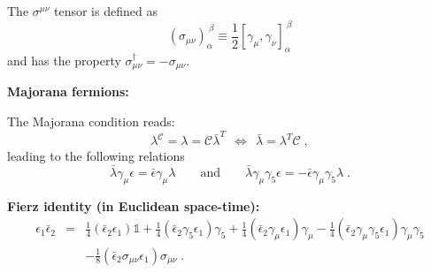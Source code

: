 \begin{appendix}
\noindent
The $\sigma^{\mu\nu}$ tensor is defined as
\begin{equation}
  (\sigma_{\mu\nu})^{~\beta}_\alpha\equiv\frac{1}{2}[\gamma_\mu,\gamma_\nu]^{~\beta}_\alpha
\end{equation}
and has the property $\sigma_{\mu\nu}^\dagger=-\sigma_{\mu\nu}$.

\noindent
\textbf{Majorana fermions:}

\noindent
The Majorana condition reads:
\begin{equation}
\label{mjconj1}
 \lambda^\mathcal{C}=\lambda=\mathcal{C}\bar{\lambda}^T~~
\Longleftrightarrow~~\bar{\lambda}=\lambda^T\mathcal{C}\;,
\end{equation}
leading to the following relations
\begin{equation}
\bar{\lambda}\gamma_{\mu}\epsilon = \bar{\epsilon}\gamma_{\mu}\lambda \qquad \text{and} \qquad \bar{\lambda}\gamma_{\mu}\gamma_{5}\epsilon = - \bar{\epsilon}\gamma_{\mu}\gamma_{5}\lambda\;.
\end{equation}

\noindent
\textbf{Fierz identity (in Euclidean space-time):}
\begin{eqnarray}
\epsilon_{1}\bar{\epsilon}_{2} &=&  \frac{1}{4}(\bar{\epsilon}_{2}\epsilon_{1})\mathbb{1} 
+ \frac{1}{4}(\bar{\epsilon}_{2}\gamma_{5}\epsilon_{1})\gamma_{5}
+ \frac{1}{4}(\bar{\epsilon}_{2}\gamma_{\mu}\epsilon_{1})\gamma_{\mu}
- \frac{1}{4}(\bar{\epsilon}_{2}\gamma_{\mu}\gamma_{5}\epsilon_{1})\gamma_{\mu}\gamma_{5}\nonumber \\
&&
- \frac{1}{8}(\bar{\epsilon}_{2}\sigma_{\mu\nu}\epsilon_{1})\sigma_{\mu\nu}    \;.
\end{eqnarray}






\end{appendix}
